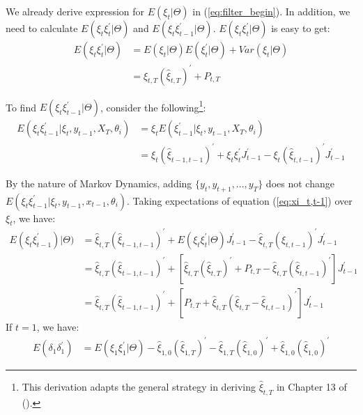 \documentclass[12pt]{article}
\numberwithin{equation}{section}
\begin{document}
We already derive expression for $E(\xi_t|\Theta)$ in (\ref{eq:filter_begin}). In addition, we need to calculate $E(\xi_t\xi_t^{'}|\Theta)$ and $E(\xi_t\xi_{t-1}^{'}|\Theta)$. $E(\xi_t\xi_t^{'}|\Theta)$ is easy to  get:
\begin{align*}
    E(\xi_t\xi_t^{'}|\Theta) & = E(\xi_t|\Theta)E(\xi_t^{'}|\Theta) + Var(\xi_t|\Theta) \\
    &= \hat{\xi}_{t,T}(\hat{\xi}_{t,T})^{'} + P_{t,T}
\end{align*}

To find $E(\xi_t\xi_{t-1}^{'}|\Theta)$, consider the following\footnote{This derivation adapts the general strategy in deriving $\hat{\xi}_{t,T}$ in Chapter 13 of (\cite{hamilton_1994}).}:
\begin{align}
    E(\xi_t\xi_{t-1}^{'}|\xi_t,y_{t-1},X_T,\theta_i) &= \xi_tE(\xi_{t-1}^{'}|\xi_t,y_{t-1},X_T,\theta_i) \nonumber \\
    &= \xi_t(\hat{\xi}_{t-1,t-1})^{'} + \xi_t\xi_t^{'}J_{t-1}^{'} - \xi_{t}(\hat{\xi}_{t,t-1})^{'}J_{t-1}^{'} \label{eq:xi_t,t-1}
\end{align}

By the nature of Markov Dynamics, adding $\{y_t, y_{t+1}, ..., y_T\}$ does not change $E(\xi_t\xi_{t-1}^{'}|\xi_t,y_{t-1},x_{t-1},\theta_i)$. Taking expectations of equation (\ref{eq:xi_t,t-1}) over $\xi_t$, we have:
\begin{align*}
    E(\xi_t\xi_{t-1}^{'})|\Theta) &= \hat{\xi}_{t,T}(\hat{\xi}_{t-1,t-1})^{'} + E(\xi_t\xi_t^{'}|\Theta)J_{t-1}^{'}
    -\hat{\xi}_{t,T}(\hat{\xi}_{t,t-1})^{'}J_{t-1}^{'} \\
    &= \hat{\xi}_{t,T}(\hat{\xi}_{t-1,t-1})^{'} + [\hat{\xi}_{t,T}(\hat{\xi}_{t,T})^{'} + P_{t,T} 
    -\hat{\xi}_{t,T}(\hat{\xi}_{t,t-1})^{'}]J_{t-1}^{'} \\
    &= \hat{\xi}_{t,T}(\hat{\xi}_{t-1,t-1})^{'} + [P_{t,T} + \hat{\xi}_{t,T}(\hat{\xi}_{t,T}-\hat{\xi}_{t,t-1})^{'}]J_{t-1}^{'}
\end{align*}
If $t=1$, we have:
\begin{align}
    E(\delta_1\delta_1^{'}) &= E(\xi_1\xi_1^{'}|\Theta) - \hat{\xi}_{1,0}(\hat{\xi}_{1,T})^{'}
    -\hat{\xi}_{1,T}(\hat{\xi}_{1,0})^{'} + \hat{\xi}_{1,0}(\hat{\xi}_{1,0})^{'}
\end{align}
\end{document}
